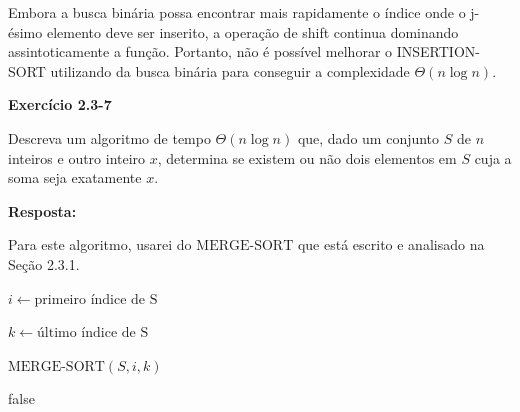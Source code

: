 \documentclass{article}
\begin{document}
    




    



    Embora a busca binária possa encontrar mais rapidamente o índice onde o j-ésimo elemento deve ser inserito, a operação de shift continua dominando assintoticamente a função. Portanto, não é possível melhorar o INSERTION-SORT utilizando da busca binária para conseguir a complexidade $\Theta(n \log n)$.


    \textbf{Exercício 2.3-7}

    Descreva um algoritmo de tempo $\Theta(n \log n)$ que, dado um conjunto $S$ de $n$ inteiros e outro inteiro $x$, determina se existem ou não dois elementos em $S$ cuja a soma seja exatamente $x$.

    \textbf{Resposta:}

    Para este algoritmo, usarei do $\text{MERGE-SORT}$ que está escrito e analisado na Seção 2.3.1.

    \begin{algorithm}[H]
        \caption{Busca-Soma}

        $i \leftarrow \text{primeiro índice de S}$

        $k \leftarrow \text{último índice de S}$
        
        
        $\text{MERGE-SORT}(S, i, k)$

        \Return false
    \end{algorithm}  
    
\end{document}
